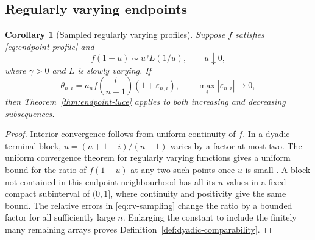\documentclass[11pt]{article}
\newtheorem{corollary}[theorem]{Corollary}
\theoremstyle{remark}
\newcommand{\eps}{\varepsilon}
\begin{document}
\subsection{Regularly varying endpoints}

\begin{corollary}[Sampled regularly varying profiles]
\label{cor:regularly-varying-endpoint}
Suppose $f$ satisfies \eqref{eq:endpoint-profile} and
\begin{equation}\label{eq:regular-variation}
        f(1-u)\sim u^\gamma L(1/u),
        \qquad u\downarrow0,
\end{equation}
where $\gamma>0$ and $L$ is slowly varying.  If
\begin{equation}\label{eq:rv-sampling}
 \theta_{n,i}
 =a_n f\left(\frac{i}{n+1}\right)(1+\eps_{n,i}),
 \qquad
 \max_i|\eps_{n,i}|\longrightarrow0,
\end{equation}
then Theorem~\ref{thm:endpoint-luce} applies to both increasing and
decreasing subsequences.
\end{corollary}

\begin{proof}
Interior convergence follows from uniform continuity of $f$.
In a dyadic terminal block, $u=(n+1-i)/(n+1)$ varies by a factor at most
two.  The uniform convergence theorem for regularly varying functions gives
a uniform bound for the ratio of $f(1-u)$ at any two such points once $u$
is small \cite[Theorems~1.2.1 and 1.5.6]{BinghamGoldieTeugels1987}.
A block not contained in this endpoint neighbourhood has all its $u$-values
in a fixed compact subinterval of $(0,1]$, where continuity and positivity
give the same bound.  The relative errors in \eqref{eq:rv-sampling}
change the ratio by a bounded factor for all sufficiently large $n$.
Enlarging the constant to include the finitely many remaining arrays proves
Definition~\ref{def:dyadic-comparability}.
\end{proof}
\end{document}
